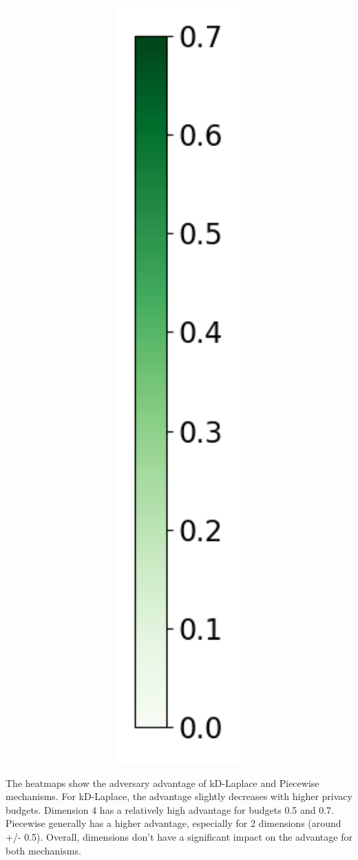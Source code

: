 \begin{figure}[H]
\begin{subfigure}[b]{0.075\textwidth}
            \includegraphics[width=1\textwidth]{Results/kd-laplace/kd-Laplace/seeds-dataset/heatmap_legend_shokri_mi_adv.png}
      \end{subfigure}
\end{figure}
The heatmaps show the adversary advantage of kD-Laplace and Piecewise mechanisms.
For kD-Laplace, the advantage slightly decreases with higher privacy budgets.
Dimension 4 has a relatively high advantage for budgets 0.5 and 0.7. Piecewise generally has a higher advantage, especially for 2 dimensions (around +/- 0.5).
Overall, dimensions don't have a significant impact on the advantage for both mechanisms.
\newpage
